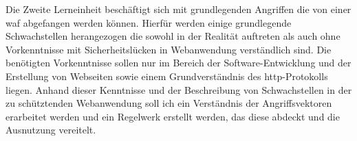 Die Zweite Lerneinheit beschäftigt sich mit grundlegenden Angriffen die von einer \ac{waf} abgefangen werden können.
Hierfür werden einige grundlegende Schwachstellen herangezogen die sowohl in der Realität auftreten als auch ohne Vorkenntnisse mit Sicherheitslücken in Webanwendung verständlich sind.
Die benötigten Vorkenntnisse sollen nur im Bereich der Software-Entwicklung und der Erstellung von Webseiten sowie einem Grundverständnis des \ac{http}-Protokolls liegen.
Anhand dieser Kenntnisse und der Beschreibung von Schwachstellen in der zu schütztenden Webanwendung soll ich ein Verständnis der Angriffsvektoren erarbeitet werden und ein Regelwerk erstellt werden, das diese abdeckt und die Ausnutzung vereitelt.